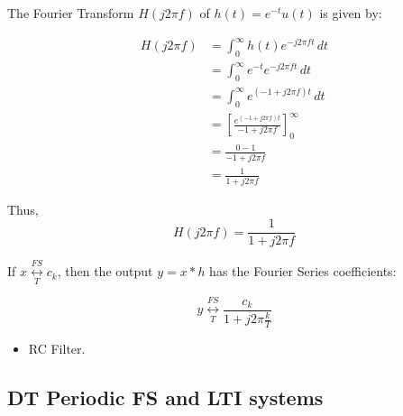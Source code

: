 \begin{example}
    The Fourier Transform \( H(j 2 \pi f) \) of \( h(t) = e^{-t} u(t) \) is given by:

    \begin{align*}
        H(j 2 \pi f) &= \int_{0}^{\infty} h(t) e^{-j 2 \pi f t} \, dt \\
        &= \int_{0}^{\infty} e^{-t} e^{-j 2 \pi f t} \, dt \\
        &= \int_{0}^{\infty} e^{(-1 + j 2 \pi f)t} \, dt \\
        &= \left[ \frac{e^{(-1 + j 2 \pi f)t}}{-1 + j 2 \pi f} \right]_{0}^{\infty} \\
        &= \frac{0 - 1}{-1 + j 2 \pi f} \\
        &= \frac{1}{1 + j 2 \pi f}
    \end{align*}

    Thus,
    \begin{equation*}
        H(j 2 \pi f) = \frac{1}{1 + j 2 \pi f}
    \end{equation*}

    \begin{center}
    \end{center}

    If \( x \underset{T}{\overset{FS}{\leftrightarrow}} c_k \), then the output \( y = x * h \) has the Fourier Series coefficients:

    \begin{equation*}
        y \underset{T}{\overset{FS}{\leftrightarrow}} \frac{c_k}{1 + j 2 \pi \frac{k}{T}}
    \end{equation*}
    \begin{itemize}
        \item RC Filter.
    \end{itemize}

\end{example}

\subsection{DT Periodic FS and LTI systems}
\begin{definition}
    
\end{definition}

